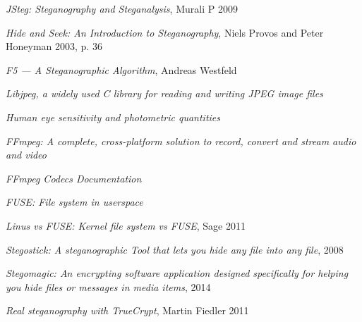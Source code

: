 \documentclass[paper=a4, fontsize=11pt,twoside]{scrartcl}
\numberwithin{table}{section}
\numberwithin{figure}{section}
\numberwithin{algorithm}{section}
\begin{document}
\begin{thebibliography}{1}
 \emph{JSteg: Steganography and Steganalysis}, Murali P 2009\\

 \emph{Hide and Seek: An Introduction to Steganography}, Niels Provos and Peter Honeyman 2003, p. 36\\

 \emph{F5 — A Steganographic Algorithm}, Andreas Westfeld\\

 \emph{Libjpeg, a widely used C library for reading and writing JPEG image files}\\

 \emph{Human eye sensitivity and photometric quantities}\\

 \emph{FFmpeg: A complete, cross-platform solution to record, convert and stream audio and video}\\

 \emph{FFmpeg Codecs Documentation}\\

 \emph{FUSE: File system in userspace}\\

 \emph{Linus vs FUSE: Kernel file system vs FUSE}, Sage 2011\\

 \emph{Stegostick: A steganographic Tool that lets you hide any file into any file}, 2008\\

 \emph{Stegomagic: An encrypting software application designed specifically for helping you hide files or messages in media items}, 2014\\

 \emph{Real steganography with TrueCrypt}, Martin Fiedler 2011\\


\end{thebibliography}
\end{document}
